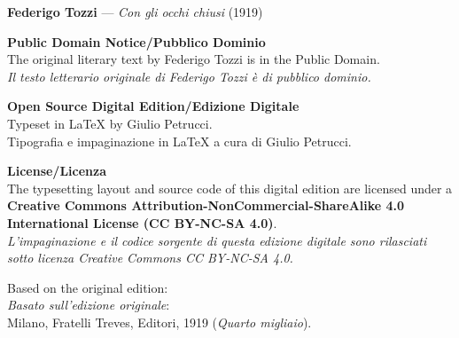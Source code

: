 \documentclass[11pt,twoside,openright]{book}
\begin{document}
\begin{small}
\setlength{\parindent}{0pt} %
\setlength{\parskip}{0.8em}   %

\textbf{Federigo Tozzi} — \textit{Con gli occhi chiusi} (1919)
\vspace{0.8em}

\textbf{Public Domain Notice\slash Pubblico Dominio}\\
The original literary text by Federigo Tozzi is in the Public Domain.\\
\textit{Il testo letterario originale di Federigo Tozzi è di pubblico dominio.}

\vspace{0.8em}

\textbf{Open Source Digital Edition\slash Edizione Digitale}\\
Typeset in \LaTeX{} by Giulio Petrucci.\\
Tipografia e impaginazione in \LaTeX{} a cura di Giulio Petrucci.

\vspace{0.8em}

\textbf{License\slash Licenza}\\
The typesetting layout and source code of this digital edition are licensed under a \textbf{Creative Commons Attribution-NonCommercial-ShareAlike 4.0 International License (CC BY-NC-SA 4.0)}.\\
\textit{L'impaginazione e il codice sorgente di questa edizione digitale sono rilasciati sotto licenza Creative Commons CC BY-NC-SA 4.0.}

\vspace{0.8em}

\noindent Based on the original edition: \\
\textit{Basato sull'edizione originale}: \\
Milano, Fratelli Treves, Editori, 1919 (\textit{Quarto migliaio}).
\end{small}

\clearpage

\tableofcontents
\clearpage

\mainmatter






































\end{document}
